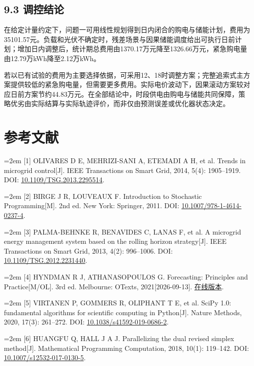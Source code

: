 \documentclass[UTF8,a4paper,zihao=-4,fontset=windows]{ctexart}
\begin{document}
\subsection{9.3 调控结论}
在给定计量约定下，问题一可用线性规划得到日内闭合的购电与储能计划，费用为35101.57元。负载和光伏不确定时，残差场景与因果储能调度给出可执行日前计划；增加日内调整后，统计期总费用由1370.17万元降至1326.66万元，紧急购电量由12.79万kWh降至2.12万kWh。
\par
若以已有试验的费用为主要选择依据，可采用12、18时调整方案；完整追索式主方案提供较低的紧急购电量，但需要更多费用。实际电价波动下，因果滚动方案较对应日前方案节约44.83万元。在全部结论中，时段供电由购电与储能共同保障，策略优劣由实际结算与实际轨迹评价，而非仅由预测误差或优化器状态决定。
\par
\clearpage
\section{参考文献}
{\small\noindent\hangindent=2em [1] OLIVARES D E, MEHRIZI-SANI A, ETEMADI A H, et al. Trends in microgrid control[J]. IEEE Transactions on Smart Grid, 2014, 5(4): 1905–1919. DOI: \href{https://doi.org/10.1109/TSG.2013.2295514}{10.1109/TSG.2013.2295514}.\par}\vspace{4pt}
{\small\noindent\hangindent=2em [2] BIRGE J R, LOUVEAUX F. Introduction to Stochastic Programming[M]. 2nd ed. New York: Springer, 2011. DOI: \href{https://doi.org/10.1007/978-1-4614-0237-4}{10.1007/978-1-4614-0237-4}.\par}\vspace{4pt}
{\small\noindent\hangindent=2em [3] PALMA-BEHNKE R, BENAVIDES C, LANAS F, et al. A microgrid energy management system based on the rolling horizon strategy[J]. IEEE Transactions on Smart Grid, 2013, 4(2): 996–1006. DOI: \href{https://doi.org/10.1109/TSG.2012.2231440}{10.1109/TSG.2012.2231440}.\par}\vspace{4pt}
{\small\noindent\hangindent=2em [4] HYNDMAN R J, ATHANASOPOULOS G. Forecasting: Principles and Practice[M/OL]. 3rd ed. Melbourne: OTexts, 2021[2026-09-13]. \href{https://otexts.com/fpp3/}{在线版本}.\par}\vspace{4pt}
{\small\noindent\hangindent=2em [5] VIRTANEN P, GOMMERS R, OLIPHANT T E, et al. SciPy 1.0: fundamental algorithms for scientific computing in Python[J]. Nature Methods, 2020, 17(3): 261–272. DOI: \href{https://doi.org/10.1038/s41592-019-0686-2}{10.1038/s41592-019-0686-2}.\par}\vspace{4pt}
{\small\noindent\hangindent=2em [6] HUANGFU Q, HALL J A J. Parallelizing the dual revised simplex method[J]. Mathematical Programming Computation, 2018, 10(1): 119–142. DOI: \href{https://doi.org/10.1007/s12532-017-0130-5}{10.1007/s12532-017-0130-5}.\par}\vspace{4pt}
\end{document}
